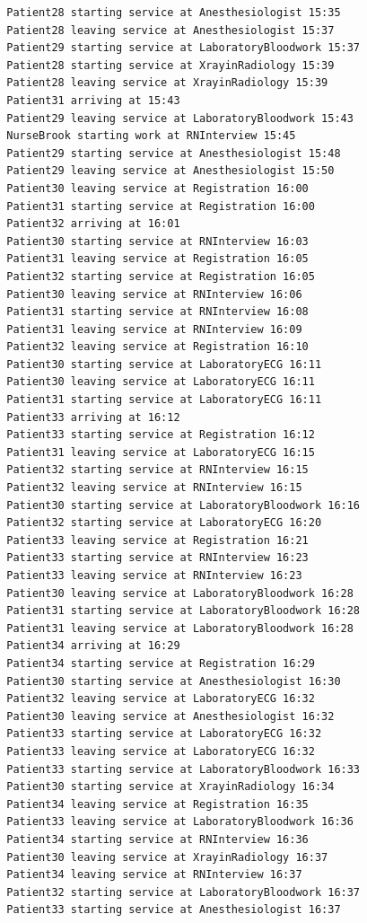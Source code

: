 \documentclass[12pt]{article}
\begin{document}
\begin{verbatim}
		Patient28 starting service at Anesthesiologist 15:35
		Patient28 leaving service at Anesthesiologist 15:37
		Patient29 starting service at LaboratoryBloodwork 15:37
		Patient28 starting service at XrayinRadiology 15:39
		Patient28 leaving service at XrayinRadiology 15:39
		Patient31 arriving at 15:43
		Patient29 leaving service at LaboratoryBloodwork 15:43
		NurseBrook starting work at RNInterview 15:45
		Patient29 starting service at Anesthesiologist 15:48
		Patient29 leaving service at Anesthesiologist 15:50
		Patient30 leaving service at Registration 16:00
		Patient31 starting service at Registration 16:00
		Patient32 arriving at 16:01
		Patient30 starting service at RNInterview 16:03
		Patient31 leaving service at Registration 16:05
		Patient32 starting service at Registration 16:05
		Patient30 leaving service at RNInterview 16:06
		Patient31 starting service at RNInterview 16:08
		Patient31 leaving service at RNInterview 16:09
		Patient32 leaving service at Registration 16:10
		Patient30 starting service at LaboratoryECG 16:11
		Patient30 leaving service at LaboratoryECG 16:11
		Patient31 starting service at LaboratoryECG 16:11
		Patient33 arriving at 16:12
		Patient33 starting service at Registration 16:12
		Patient31 leaving service at LaboratoryECG 16:15
		Patient32 starting service at RNInterview 16:15
		Patient32 leaving service at RNInterview 16:15
		Patient30 starting service at LaboratoryBloodwork 16:16
		Patient32 starting service at LaboratoryECG 16:20
		Patient33 leaving service at Registration 16:21
		Patient33 starting service at RNInterview 16:23
		Patient33 leaving service at RNInterview 16:23
		Patient30 leaving service at LaboratoryBloodwork 16:28
		Patient31 starting service at LaboratoryBloodwork 16:28
		Patient31 leaving service at LaboratoryBloodwork 16:28
		Patient34 arriving at 16:29
		Patient34 starting service at Registration 16:29
		Patient30 starting service at Anesthesiologist 16:30
		Patient32 leaving service at LaboratoryECG 16:32
		Patient30 leaving service at Anesthesiologist 16:32
		Patient33 starting service at LaboratoryECG 16:32
		Patient33 leaving service at LaboratoryECG 16:32
		Patient33 starting service at LaboratoryBloodwork 16:33
		Patient30 starting service at XrayinRadiology 16:34
		Patient34 leaving service at Registration 16:35
		Patient33 leaving service at LaboratoryBloodwork 16:36
		Patient34 starting service at RNInterview 16:36
		Patient30 leaving service at XrayinRadiology 16:37
		Patient34 leaving service at RNInterview 16:37
		Patient32 starting service at LaboratoryBloodwork 16:37
		Patient33 starting service at Anesthesiologist 16:37

\end{verbatim}
\end{document}

